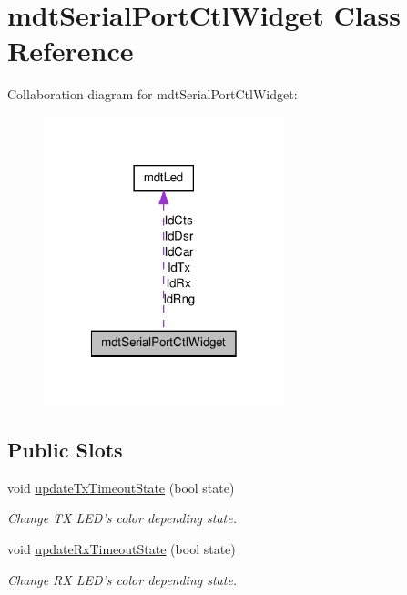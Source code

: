 \hypertarget{classmdt_serial_port_ctl_widget}{
\section{mdtSerialPortCtlWidget Class Reference}
\label{classmdt_serial_port_ctl_widget}
}


Collaboration diagram for mdtSerialPortCtlWidget:
\nopagebreak
\begin{figure}[H]
\begin{center}
\leavevmode
\includegraphics[width=198pt]{classmdt_serial_port_ctl_widget__coll__graph}
\end{center}
\end{figure}
\subsection*{Public Slots}
\begin{DoxyCompactItemize}
\item 
\hypertarget{classmdt_serial_port_ctl_widget_a79cd97b8359da815298c99e6b90bc147}{
void \hyperlink{classmdt_serial_port_ctl_widget_a79cd97b8359da815298c99e6b90bc147}{updateTxTimeoutState} (bool state)}
\label{classmdt_serial_port_ctl_widget_a79cd97b8359da815298c99e6b90bc147}

\begin{DoxyCompactList}\small\item\em Change TX LED's color depending state. \end{DoxyCompactList}\item 
\hypertarget{classmdt_serial_port_ctl_widget_a5cbb9a5ef4098dec46a9330372dc882c}{
void \hyperlink{classmdt_serial_port_ctl_widget_a5cbb9a5ef4098dec46a9330372dc882c}{updateRxTimeoutState} (bool state)}
\label{classmdt_serial_port_ctl_widget_a5cbb9a5ef4098dec46a9330372dc882c}

\begin{DoxyCompactList}\small\item\em Change RX LED's color depending state. \end{DoxyCompactList}\end{DoxyCompactItemize}
